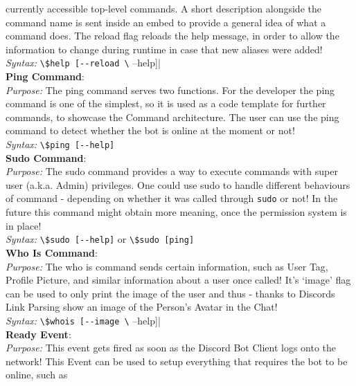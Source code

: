 \documentclass{tikzposter}
\newcommand{\code}[1]{\colorbox{codegray}{\lstinline|#1|}}
\begin{document}
\begin{columns}
{            currently accessible top-level commands. A short description
            alongside the command name is sent inside an embed to provide a
            general idea of what a command does. The reload flag reloads
            the help message, in order to allow the information to change 
            during runtime in case that new aliases were added!\\
            \textit{Syntax:} \code{\$help [--reload \| --help]}\\
            \textbf{Ping Command}:\\
            \textit{Purpose:} The ping command serves two functions. For the
            developer the ping command is one of the simplest, so it is used
            as a code template for further commands, to showcase the Command
            architecture. The user can use the ping command to detect whether
            the bot is online at the moment or not!\\
            \textit{Syntax:} \code{\$ping [--help]}\\
            \textbf{Sudo Command}:\\
            \textit{Purpose:} The sudo command provides a way to execute 
            commands with super user (a.k.a. Admin) privileges. One could use
            sudo to handle different behaviours of command - depending on 
            whether it was called through \code{sudo} or not! In the future
            this command might obtain more meaning, once the permission system
            is in place!\\
            \textit{Syntax:} \code{\$sudo [--help]} or \code{\$sudo [ping]}\\
            \textbf{Who Is Command}:\\
            \textit{Purpose:} The who is command sends certain information, 
            such as User Tag, Profile Picture, and similar information about
            a user once called! It's `image' flag can be used to only print
            the image of the user and thus - thanks to Discords Link Parsing
            show an image of the Person's Avatar in the Chat!\\
            \textit{Syntax:} \code{\$whois [--image \| --help]}\vspace{2cm}\\
            \textbf{Ready Event}:\\
            \textit{Purpose:} This event gets fired as soon as the Discord
            Bot Client logs onto the network! This Event can be used to 
            setup everything that requires the bot to be online, such as
}
\end{columns}
\end{document}
